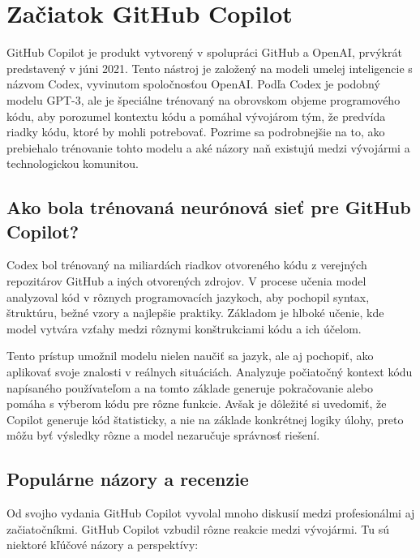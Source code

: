 \documentclass[10pt,oneside,slovak,a4paper, onecolumn]{article}
\begin{document}
\section{Začiatok GitHub Copilot}
GitHub Copilot je produkt vytvorený v spolupráci GitHub a OpenAI, prvýkrát predstavený v júni 2021. Tento nástroj je založený na modeli umelej inteligencie s názvom Codex, vyvinutom spoločnosťou OpenAI. 
Podľa \cite{kumar2023open} Codex je podobný modelu GPT-3, ale je špeciálne trénovaný na obrovskom objeme programového kódu, aby porozumel kontextu kódu a pomáhal vývojárom tým, že predvída riadky kódu, ktoré by mohli potrebovať. Pozrime sa podrobnejšie na to, ako prebiehalo trénovanie tohto modelu a aké názory naň existujú medzi vývojármi a technologickou komunitou.

\subsection{Ako bola trénovaná neurónová sieť pre GitHub Copilot?}

Codex bol trénovaný na miliardách riadkov otvoreného kódu z verejných repozitárov GitHub a iných otvorených zdrojov. V procese učenia model analyzoval kód v rôznych programovacích jazykoch, aby pochopil syntax, štruktúru, bežné vzory a najlepšie praktiky. Základom je hlboké učenie, kde model vytvára vzťahy medzi rôznymi konštrukciami kódu a ich účelom.

Tento prístup umožnil modelu nielen naučiť sa jazyk, ale aj pochopiť, ako aplikovať svoje znalosti v reálnych situáciách. Analyzuje počiatočný kontext kódu napísaného používateľom a na tomto základe generuje pokračovanie alebo pomáha s výberom kódu pre rôzne funkcie. Avšak je dôležité si uvedomiť, že Copilot generuje kód štatisticky, a nie na základe konkrétnej logiky úlohy, preto môžu byť výsledky rôzne a model nezaručuje správnosť riešení.

\subsection{Populárne názory a recenzie}
Od svojho vydania GitHub Copilot vyvolal mnoho diskusií medzi profesionálmi aj začiatočníkmi. GitHub Copilot vzbudil rôzne reakcie medzi vývojármi. Tu sú niektoré kľúčové názory a perspektívy:
\end{document}
